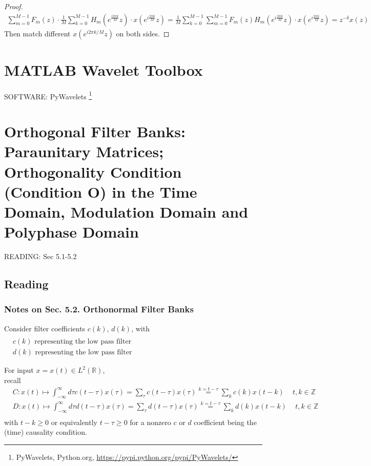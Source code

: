 \documentclass[twoside]{amsart}
\theoremstyle{plain}
\theoremstyle{definition}
\theoremstyle{remark}
\numberwithin{equation}{section}
\begin{document}
\begin{proof}
  \[
\begin{gathered}
  \sum_{m=0}^{M-1} F_m(z) \cdot \frac{1}{M} \sum_{k=0}^{M-1} H_m(e^{\frac{i2\pi k}{M} }z ) \cdot x(e^{i\frac{2\pi k}{M} }z ) = \frac{1}{M} \sum_{k=0}^{M-1} \sum_{m=0}^{M-1} F_m(z) H_m(e^{ i \frac{2\pi k}{M} } z) \cdot x(e^{i \frac{2\pi k}{M} } z) = z^{-\delta} x(z) 
\end{gathered}
\]
Then match different $x(e^{i2\pi k/M }z)$ on both sides.  
\end{proof}




\section{MATLAB Wavelet Toolbox}

SOFTWARE: PyWavelets \footnote{PyWavelets, Python.org, \url{https://pypi.python.org/pypi/PyWavelets/}}

\section{Orthogonal Filter Banks: Paraunitary Matrices; Orthogonality Condition (Condition O) in the Time Domain, Modulation Domain and Polyphase Domain}

READING: Sec 5.1-5.2 \cite{GStrangTNguyen1996}

\subsection{Reading}

\subsubsection{Notes on Sec. 5.2. Orthonormal Filter Banks}\label{SubSubSec:OrthonormalFilterBanks}

Consider filter coefficients $c(k)$, $d(k)$, with \\
$\begin{aligned} 
  & \quad \\
  & c(k) \text{ representing the low pass filter } \\
  & d(k) \text{ representing the low pass filter } \end{aligned}$

For input $x=x(t) \in L^2(\mathbb{R})$, \\
recall
\[
\begin{aligned}
  & C:x(t) \mapsto \int_{-\infty}^{\infty} d\tau c(t-\tau) x(\tau) = \sum_{\tau} c(t-\tau) x(\tau) \overset{k = t-\tau}{=} \sum_k c(k) x(t-k) \quad \, t,k \in \mathbb{Z} \\ 
  & D:x(t) \mapsto \int_{-\infty}^{\infty} d\tau d(t-\tau) x(\tau) = \sum_{\tau} d(t-\tau) x(\tau) \overset{k = t-\tau}{=} \sum_k d(k) x(t-k) \quad \, t,k \in \mathbb{Z} \\ 
\end{aligned}
\]
with $t-k\geq 0$ or equivalently $t-\tau \geq 0$ for a nonzero $c$ or $d$ coefficient being the (time) causality condition. 
\end{document}
